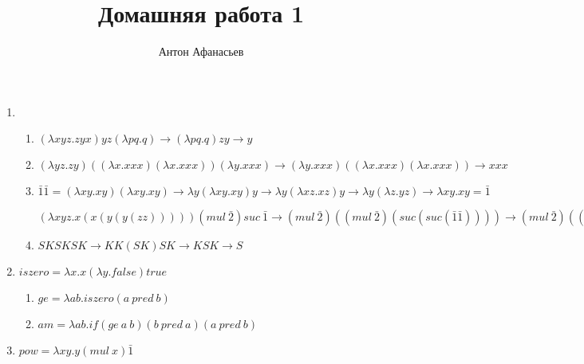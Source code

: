 \documentclass[10pt]{article}
\begin{document}
\title{Домашняя работа 1}
\author{Антон Афанасьев}
\maketitle

\begin{enumerate}
	\item
	\begin{enumerate}
		\item $
		(\lambda x y z.zyx)yz(\lambda pq.q) \to 
		(\lambda pq.q)zy \to
		y
		$
		
		\item $
		(\lambda y z.zy)((\lambda x.xxx)(\lambda x.xxx))(\lambda y.xxx) \to
		(\lambda y.xxx)((\lambda x.xxx)(\lambda x.xxx)) \to
		xxx
		$
		
		\item 
		$\bar 1 \bar 1 = (\lambda xy.xy)(\lambda xy.xy) \to \lambda y (\lambda xy.xy)y \to \lambda y (\lambda xz.xz) y \to \lambda y(\lambda z.yz) \to \lambda xy.xy = \bar 1$
		
		$
		(\lambda xyz.x(x(y(y(zz)))))(mul\ \bar 2) suc\ \bar 1 \to
		(mul\ \bar 2)((mul\ \bar 2)(suc(suc(\bar 1 \bar 1)))) \to
		(mul\ \bar 2)((mul\ \bar 2)(suc(suc\ \bar 1))) \to
		(mul\ \bar 2)((mul\ \bar 2)(suc\ \bar 2)) \to
		(mul\ \bar 2)(mul\ \bar 2\ \bar 3) \to
		mul\ \bar 2\ \bar 6 \to
		\overline{12}
		$
		
		\item $	
		SKSKSK \to
		KK(SK)SK \to
		KSK \to
		S
		$
	\end{enumerate}
	
	\item 
	$iszero = \lambda x.x (\lambda y.false) true$
	\begin{enumerate}
		\item $ge = \lambda ab . iszero (a\ pred\ b)$
		\item $am = \lambda ab . if (ge\ a\ b) (b\ pred\ a) (a\ pred\ b)$
	\end{enumerate}
	
	\item $pow = \lambda xy . y (mul\ x) \bar 1$

\end{enumerate}
\end{document}
